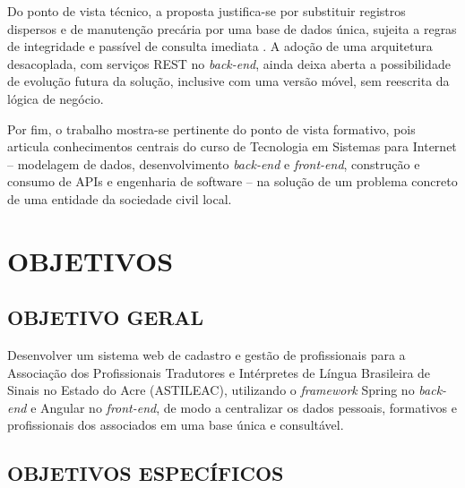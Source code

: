 \documentclass[
        oneside,      %
        english,			
        brazil			 
        ]{abntspiifac}
\begin{document}
Do ponto de vista técnico, a proposta justifica-se por substituir registros dispersos e de manutenção precária por uma base de dados única, sujeita a regras de integridade e passível de consulta imediata \citep{elmasri2019sistemas}. A adoção de uma arquitetura desacoplada, com serviços REST no \textit{back-end}, ainda deixa aberta a possibilidade de evolução futura da solução, inclusive com uma versão móvel, sem reescrita da lógica de negócio.

Por fim, o trabalho mostra-se pertinente do ponto de vista formativo, pois articula conhecimentos centrais do curso de Tecnologia em Sistemas para Internet -- modelagem de dados, desenvolvimento \textit{back-end} e \textit{front-end}, construção e consumo de APIs e engenharia de software -- na solução de um problema concreto de uma entidade da sociedade civil local.


\chapter{OBJETIVOS}

\section{OBJETIVO GERAL}

Desenvolver um sistema web de cadastro e gestão de profissionais para a Associação dos Profissionais Tradutores e Intérpretes de Língua Brasileira de Sinais no Estado do Acre (ASTILEAC), utilizando o \textit{framework} Spring no \textit{back-end} e Angular no \textit{front-end}, de modo a centralizar os dados pessoais, formativos e profissionais dos associados em uma base única e consultável.

\section{OBJETIVOS ESPECÍFICOS}
\end{document}
